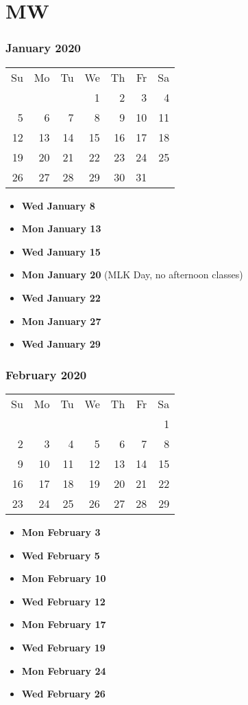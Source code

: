 \documentclass[11pt]{article}
\begin{document}
\section{MW}
\subsubsection*{January 2020}
\begin{tabular}{rrrrrrr}
Su & Mo & Tu & We & Th & Fr & Sa\\
   &    &    &  1 &  2 &  3 &  4\\ 
 5 &  6 &  7 &  8 &  9 & 10 & 11\\ 
12 & 13 & 14 & 15 & 16 & 17 & 18\\ 
19 & 20 & 21 & 22 & 23 & 24 & 25\\ 
26 & 27 & 28 & 29 & 30 & 31 &\\
\end{tabular}
\begin{itemize}
\item\textbf{Wed January  8}
\item\textbf{Mon January 13}
\item\textbf{Wed January 15}
\item\textbf{Mon January 20} (MLK Day, no afternoon classes)
\item\textbf{Wed January 22}
\item\textbf{Mon January 27}
\item\textbf{Wed January 29}
\end{itemize}
\hrulefill

\subsubsection*{February 2020}
\begin{tabular}{rrrrrrr}
Su & Mo & Tu & We & Th & Fr & Sa\\
   &    &    &    &    &    &  1\\ 
 2 &  3 &  4 &  5 &  6 &  7 &  8\\ 
 9 & 10 & 11 & 12 & 13 & 14 & 15\\ 
16 & 17 & 18 & 19 & 20 & 21 & 22\\ 
23 & 24 & 25 & 26 & 27 & 28 & 29\\ 
\end{tabular}
\begin{itemize}
\item\textbf{Mon February  3}
\item\textbf{Wed February  5}
\item\textbf{Mon February 10}
\item\textbf{Wed February 12}
\item\textbf{Mon February 17}
\item\textbf{Wed February 19}
\item\textbf{Mon February 24}
\item\textbf{Wed February 26}
\end{itemize}
\hrulefill
\end{document}
